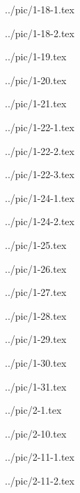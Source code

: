 

../pic/1-18-1.tex



../pic/1-18-2.tex



../pic/1-19.tex



../pic/1-20.tex



../pic/1-21.tex



../pic/1-22-1.tex



../pic/1-22-2.tex



../pic/1-22-3.tex



../pic/1-24-1.tex



../pic/1-24-2.tex



../pic/1-25.tex



../pic/1-26.tex



../pic/1-27.tex



../pic/1-28.tex



../pic/1-29.tex



../pic/1-30.tex



../pic/1-31.tex



../pic/2-1.tex



../pic/2-10.tex



../pic/2-11-1.tex



../pic/2-11-2.tex



